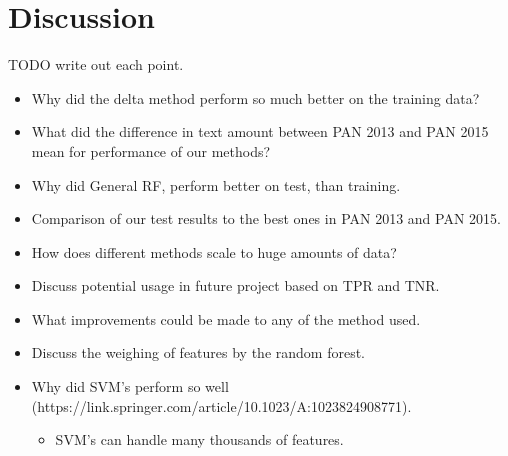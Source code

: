 \section{Discussion}
TODO write out each point.

\begin{itemize}
    \item Why did the delta method perform so much better on the training data?
    \item What did the difference in text amount between PAN 2013 and PAN 2015
        mean for performance of our methods?
    \item Why did General RF, perform better on test, than training.
    \item Comparison of our test results to the best ones in PAN 2013 and PAN
        2015.
    \item How does different methods scale to huge amounts of data?
    \item Discuss potential usage in future project based on TPR and TNR.
    \item What improvements could be made to any of the method used.
    \item Discuss the weighing of features by the random forest.
    \item Why did SVM's perform so well (https://link.springer.com/article/10.1023/A:1023824908771).
        \begin{itemize}
            \item SVM's can handle many thousands of features.
        \end{itemize}
\end{itemize}
